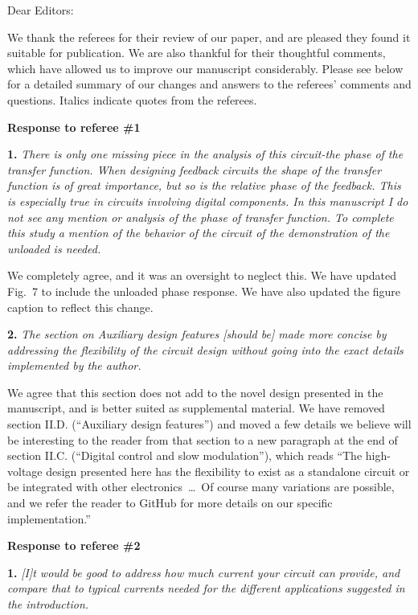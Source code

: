 \documentclass[12pt, oneside]{letter}   	%
\begin{document}
Dear Editors:

We thank the referees for their review of our paper, and are pleased they found it suitable for publication.
We are also thankful for their thoughtful comments, which have allowed us to improve our manuscript considerably.
Please see below for a detailed summary of our changes and answers to the referees' comments and questions.
Italics indicate quotes from the referees.

\textbf{Response to referee \#1}

\textbf{1.}
\textit{There is only one missing piece in the analysis of this circuit-the phase of the transfer function. 
When designing feedback circuits the shape of the transfer function is of great importance, but so is the relative phase of the feedback. 
This is especially true in circuits involving digital components. 
In this manuscript I do not see any mention or analysis of the phase of transfer function. 
To complete this study a mention of the behavior of the circuit of the demonstration of the unloaded is needed.}

We completely agree, and it was an oversight to neglect this.
We have updated Fig.~7 to include the unloaded phase response.
We have also updated the figure caption to reflect this change.


\textbf{2.}
\textit{The section on Auxiliary design features [should be] made more concise by addressing the flexibility of the circuit design without going into the exact details implemented by the author. }

We agree that this section does not add to the novel design presented in the manuscript, and is better suited as supplemental material.
We have removed section II.D. (``Auxiliary design features'') and moved a few details we believe will be interesting to the reader from that section to a new paragraph at the end of section II.C. (``Digital control and slow modulation''), which reads ``The high-voltage design presented here has the flexibility to exist as a standalone circuit or be integrated with other electronics~\ldots~Of course many variations are possible, and we refer the reader to GitHub for more details on our specific implementation.''

\textbf{Response to referee \#2}

\textbf{1.}
\textit{[I]t would be good to address how much current your circuit can provide, and compare that to typical currents needed for the different applications suggested in the introduction.}
\end{document}
